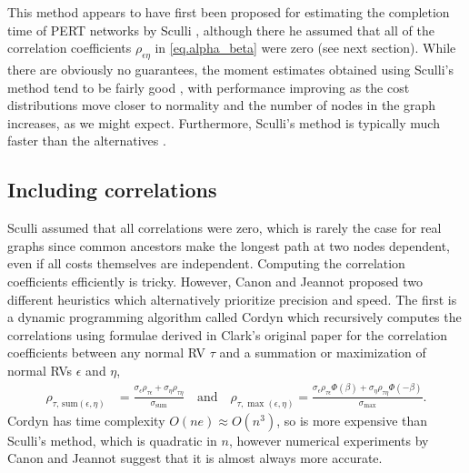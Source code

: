 \documentclass[12pt]{article}
\begin{document}
This method appears to have first been proposed for estimating the completion time of PERT networks by Sculli \cite{scu83}, although there he assumed that all of the correlation coefficients $\rho_{\epsilon \eta}$ in \eqref{eq.alpha_beta} were zero (see next section). While there are obviously no guarantees, the moment estimates obtained using Sculli's method tend to be fairly good \cite{kam85}, with performance improving as the cost distributions move closer to normality and the number of nodes in the graph increases, as we might expect. Furthermore, Sculli's method is typically much faster than the alternatives \cite{can16}. 

\subsection{Including correlations}
\label{subsect.correlation_aware}

Sculli assumed that all correlations were zero, which is rarely the case for real graphs since common ancestors make the longest path at two nodes dependent, even if all costs themselves are independent. Computing the correlation coefficients efficiently is tricky. However, Canon and Jeannot \cite{can16} proposed two different heuristics which alternatively prioritize precision and speed. The first is a dynamic programming algorithm called Cordyn which recursively computes the correlations using formulae derived in Clark's original paper for the correlation coefficients between any normal RV $\tau$ and a summation or maximization of normal RVs $\epsilon$ and $\eta$, 
\begin{align*}
  \rho_{\tau, \, \text{sum}(\epsilon, \eta)} &= \frac{\sigma_\epsilon \rho_{\tau \epsilon} + \sigma_\eta \rho_{\tau \eta} }{\sigma_{\text{sum}}} \quad \text{and} \quad
\rho_{\tau, \max(\epsilon, \eta)} = \frac{\sigma_\epsilon \rho_{\tau \epsilon} \Phi(\beta) + \sigma_\eta \rho_{\tau \eta} \Phi(-\beta)}{\sigma_{\max}}.
\end{align*} 
Cordyn has time complexity $O(ne) \approx O(n^3)$, so is more expensive than Sculli's method, which is quadratic in $n$, however numerical experiments by Canon and Jeannot suggest that it is almost always more accurate. 
\end{document}
